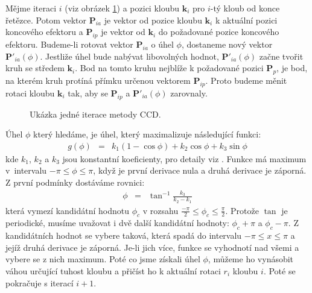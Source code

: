 Mějme iteraci $i$ (viz obrázek \ref{ccd_img}) a pozici kloubu $\mathbf{k}_i$ pro $i$-tý kloub od konce řetězce. Potom vektor $\mathbf{P}_{ia}$ je vektor od pozice kloubu $\mathbf{k}_i$ k aktuální pozici koncového efektoru a $\mathbf{P}_{ip}$ je vektor od $\mathbf{k}_i$ do požadované pozice koncového efektoru. Budeme-li rotovat vektor $\mathbf{P}_{ia}$ o úhel $\phi$, dostaneme nový vektor $\mathbf{P}'_{ia}(\phi)$. Jestliže úhel bude nabývat libovolných hodnot, $\mathbf{P}'_{ia}(\phi)$ začne tvořit kruh se středem $\mathbf{k}_i$. Bod na tomto kruhu nejblíže k požadované pozici $\mathbf{P}_p$, je bod, na kterém kruh protíná přímku určenou vektorem $\mathbf{P}_{ip}$. Proto budeme měnit rotaci kloubu $\mathbf{k}_i$ tak, aby se $\mathbf{P}_{ip}$ a $\mathbf{P}'_{ia}(\phi)$ zarovnaly.
\begin{figure}[h]
\begin{center}
\caption{Ukázka jedné iterace metody CCD.} \label{ccd_img}
\end{center}
\end{figure}
Úhel $\phi$ který hledáme, je úhel, který maximalizuje následující funkci:
\begin{eqnarray}
g(\phi) &=& k_1(1 - \cos\phi) + k_2 \cos\phi + k_3 \sin\phi\label{r.ccd_max1}
\end{eqnarray}
kde $k_1$, $k_2$ a $k_3$ jsou konstantní koeficienty, pro detaily viz \cite{welman}. Funkce má maximum v~intervalu $-\pi \leq \phi \leq \pi$, když je první derivace nula a druhá derivace je záporná. Z první podmínky dostáváme rovnici:
\begin{eqnarray}
\phi &=& \tan^{-1}\frac{k_3}{k_2 - k_1}\label{r.ccd_max2}
\end{eqnarray}
která vymezí kandidátní hodnotu $\phi_c$ v rozsahu $\frac{-\pi}{2} \leq \phi_c \leq \frac{\pi}{2}$. Protože $\tan$ je periodické, musíme uvažovat i dvě další kandidátní hodnoty: $\phi_c + \pi$ a $\phi_c - \pi$. Z kandidátních hodnot se vybere taková, která spadá do intervalu $-\pi \leq x \leq \pi$ a jejíž druhá derivace je záporná. Je-li jich více, funkce se vyhodnotí nad všemi a vybere se z nich maximum. Poté co jsme získali úhel $\phi$, můžeme ho vynásobit váhou určující tuhost kloubu a přičíst ho k aktuální rotaci $r_i$ kloubu $i$. Poté se pokračuje s iterací $i+1$.

